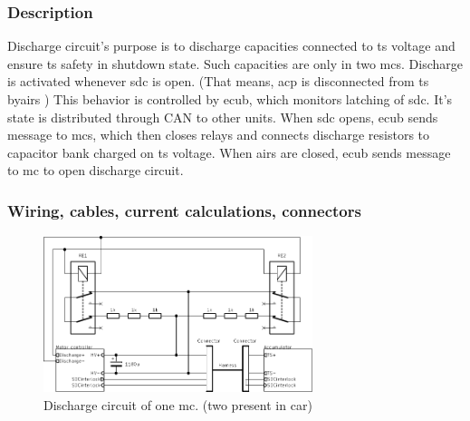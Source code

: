 \subsubsection{Description}

Discharge circuit's purpose is to discharge capacities connected to \gls{ts} voltage and ensure \gls{ts} safety in shutdown state. Such capacities are only in two \glspl{mc}.
Discharge is activated whenever \gls{sdc} is open. (That means, \gls{acp} is disconnected from \gls{ts} by\glspl{air} ) This behavior is controlled by \gls{ecub}, which monitors latching of \gls{sdc}. It's state is distributed through CAN to other units.
When \gls{sdc} opens, \gls{ecub} sends message to \glspl{mc}, which then closes relays and connects discharge resistors to capacitor bank charged on \gls{ts} voltage.
When \glspl{air} are closed, \gls{ecub} sends message to \gls{mc} to open discharge circuit.

\subsubsection{Wiring, cables, current calculations, connectors}

\begin{figure}[H]
	\centering
	\includegraphics[width=0.7\textwidth]{./img/MC_discharge.pdf}
	\caption{Discharge circuit of one \gls{mc}. (two present in car)}
	\label{fig:discharge-circuit}
\end{figure}

